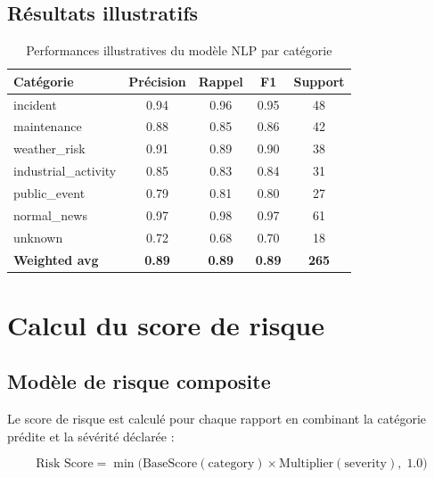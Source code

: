 \documentclass[12pt,a4paper]{report}
\begin{document}
\subsection{R\'{e}sultats illustratifs}

\begin{table}[H]
\centering
\caption{Performances illustratives du mod\`{e}le NLP par cat\'{e}gorie}
\label{tab:nlp_per_class}
\renewcommand{\arraystretch}{1.4}
\begin{tabular}{|l|c|c|c|c|}
\hline
\rowcolor{primaryblue!20}
\textbf{Cat\'{e}gorie} & \textbf{Pr\'{e}cision} & \textbf{Rappel} & \textbf{F1} & \textbf{Support} \\
\hline
incident & 0.94 & 0.96 & 0.95 & 48 \\
maintenance & 0.88 & 0.85 & 0.86 & 42 \\
weather\_risk & 0.91 & 0.89 & 0.90 & 38 \\
industrial\_activity & 0.85 & 0.83 & 0.84 & 31 \\
public\_event & 0.79 & 0.81 & 0.80 & 27 \\
normal\_news & 0.97 & 0.98 & 0.97 & 61 \\
unknown & 0.72 & 0.68 & 0.70 & 18 \\
\hline
\rowcolor{gray!15}
\textbf{Weighted avg} & \textbf{0.89} & \textbf{0.89} & \textbf{0.89} & \textbf{265} \\
\hline
\end{tabular}
\end{table}

\section{Calcul du score de risque}

\subsection{Mod\`{e}le de risque composite}

Le score de risque est calcul\'{e} pour chaque rapport en combinant la cat\'{e}gorie pr\'{e}dite et la s\'{e}v\'{e}rit\'{e} d\'{e}clar\'{e}e :

\begin{equation}
  \text{Risk Score} = \min\!\Big(\text{BaseScore}(\text{category}) \times \text{Multiplier}(\text{severity}),\; 1.0\Big)
  \label{eq:risk}
\end{equation}
\end{document}
